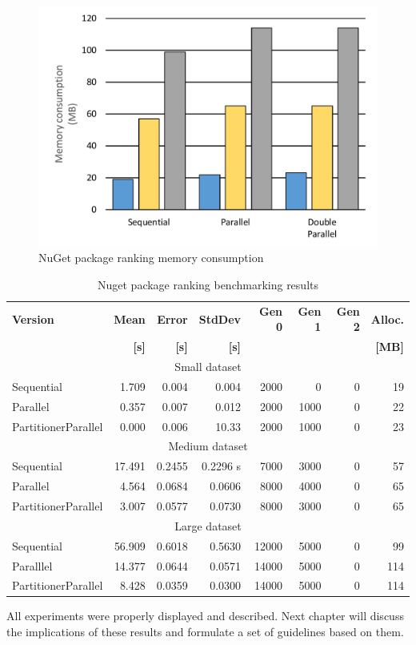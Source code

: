 \begin{figure}[htb]
\centering
\includegraphics[width=.8\linewidth]{figures04/NugetMemory.pdf}
\caption{NuGet package ranking memory consumption}
\label{fig: NugetMemory}
\end{figure}

\begin{table}[!ht]
    \centering
    \caption{Nuget package ranking benchmarking results}
		\label{tab: NugetBenchmarking}
    \begin{tabularx}{\linewidth}{Xrrrrrrr} 
		  \toprule
			\toprule
			\bfseries Version 		&
			\bfseries Mean 	      &
			\bfseries Error       &
			\bfseries StdDev 	    &
			\bfseries Gen 0	    	&
			\bfseries Gen 1	    	&
			\bfseries Gen 2	    	&
			\bfseries Alloc.      \\ 
			&
			\bfseries {[}s{]} &
			\bfseries {[}s{]} &
			\bfseries {[}s{]} &
			&
			&
			&
			\bfseries{[}MB{]} \\			
			\midrule 
			\multicolumn{8}{c}{Small dataset} \\ 
			\midrule
			Sequential & 1.709 	& 0.004 	& 0.004 	& 2000 & 0 &    0 &	19  \\
			Parallel & 0.357 	& 0.007 	 & 0.012 	& 2000 & 1000 &	0 &	22  \\
			PartitionerParallel & 0.000  & 0.006 	& 10.33 	& 2000 & 1000 &	0 &	23  \\
			\midrule
			\multicolumn{8}{c}{Medium dataset} \\ 
			\midrule
			Sequential & 17.491    &  0.2455&	0.2296 s& 7000 & 3000 &	0 &	57  \\
			Parallel & 4.564     & 0.0684 &0.0606& 8000 & 4000 &	0 &	65 \\
			PartitionerParallel & 3.007     & 0.0577 &0.0730& 8000 & 3000 &	0 &	65  \\
			\midrule
            \multicolumn{8}{c}{Large dataset} \\ 
			\midrule
			Sequential    &      56.909&	0.6018&	0.5630&	12000 & 	5000 &	0	& 99   \\
			Paralllel     &      14.377&	0.0644&	0.0571&	14000 &	5000	 &0	& 114  \\
			PartitionerParallel &  8.428 &	0.0359&	0.0300&	14000 &	5000 &0	& 114  \\
			\bottomrule
    \end{tabularx}
\end{table}

All experiments were properly displayed and described. Next chapter will 
discuss the implications of these results and formulate a set of guidelines 
based on them. 


